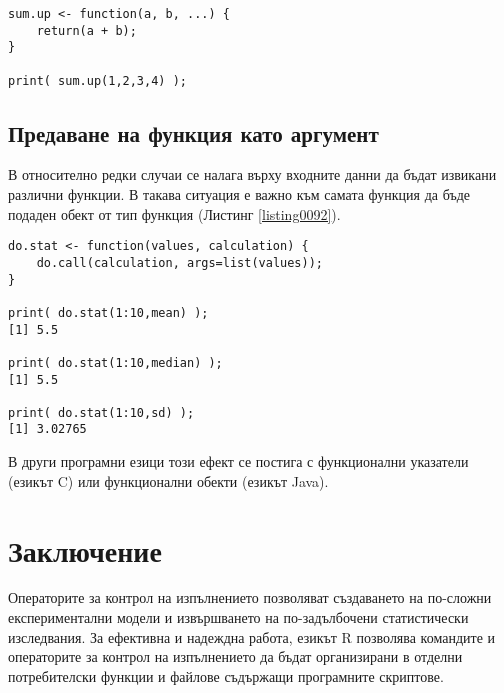 \begin{lstlisting}[caption=Връщане на стойност от функция, label=listing0091]
sum.up <- function(a, b, ...) {
	return(a + b);
}

print( sum.up(1,2,3,4) );
\end{lstlisting}

\subsection{Предаване на функция като аргумент}

В относително редки случаи се налага върху входните данни да бъдат извикани различни функции. В такава ситуация е важно към самата функция да бъде подаден обект от тип функция (Листинг \ref{listing0092}).

\begin{lstlisting}[caption=Избор на функция за извикване по време на изпълнение, label=listing0092]
do.stat <- function(values, calculation) {
	do.call(calculation, args=list(values));
}

print( do.stat(1:10,mean) );
[1] 5.5

print( do.stat(1:10,median) );
[1] 5.5

print( do.stat(1:10,sd) );
[1] 3.02765
\end{lstlisting}

В други програмни езици този ефект се постига с функционални указатели (езикът C) или функционални обекти (езикът Java).

\section*{Заключение}

Операторите за контрол на изпълнението позволяват създаването на по-сложни експериментални модели и извършването на по-задълбочени статистически изследвания. За ефективна и надеждна работа, езикът R позволява командите и операторите за контрол на изпълнението да бъдат организирани в отделни потребителски функции и файлове съдържащи програмните скриптове. 

